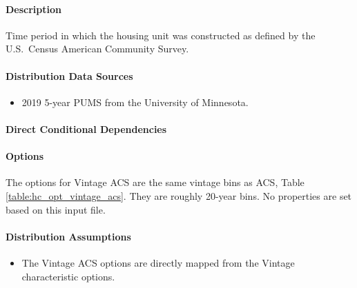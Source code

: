 \paragraph{Description}
% 
Time period in which the housing unit was constructed as defined by the U.S.~Census American Community Survey.

\paragraph{Distribution Data Sources}
% 
\begin{itemize}
    \item 2019 5-year PUMS from the University of Minnesota.
\end{itemize}

\paragraph{Direct Conditional Dependencies}


\paragraph{Options}
The options for Vintage ACS are the same vintage bins as ACS, Table \ref{table:hc_opt_vintage_acs}. They are roughly 20-year bins. No properties are set based on this input file.



\paragraph{Distribution Assumptions}
% 
\begin{itemize}
    \item The Vintage ACS options are directly mapped from the Vintage characteristic options.
\end{itemize}
